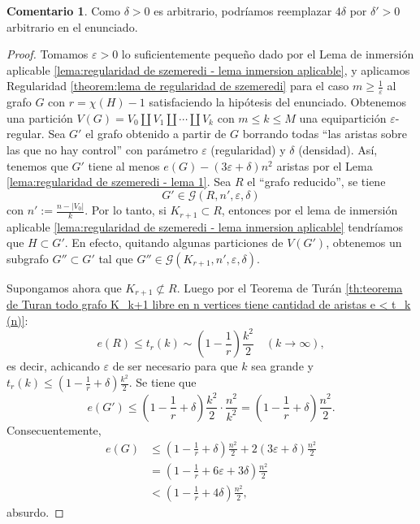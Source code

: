 \documentclass[12pt]{report}
\theoremstyle{plain}
\theoremstyle{definition}
\newtheorem{remark}[theorem]{Comentario}
\newcommand{\abs}[1]{\left \vert #1 \right \vert}
\begin{document}
\begin{remark}
Como $\delta > 0$ es arbitrario, podríamos reemplazar $4\delta$ por $\delta ' > 0$ arbitrario en el enunciado.
\end{remark}

\begin{proof}
Tomamos $\varepsilon > 0$ lo suficientemente pequeño dado por el Lema de inmersión aplicable \ref{lema:regularidad de szemeredi - lema inmersion aplicable}, y aplicamos Regularidad \ref{theorem:lema de regularidad de szemeredi} para el caso $m \geq \frac 1 \varepsilon$ al grafo $G$ con $r = \chi (H) -1$ satisfaciendo la hipótesis del enunciado. Obtenemos una partición $V(G) = V_0 \coprod V_1 \coprod \cdots \coprod V_k$ con $m \leq k \leq M$ una equipartición $\varepsilon$-regular. Sea $G'$ el grafo obtenido a partir de $G$ borrando todas ``las aristas sobre las que no hay control'' con parámetro $\varepsilon$ (regularidad) y $\delta$ (densidad). Así, tenemos que $G'$ tiene al menos $e(G) - (3 \varepsilon + \delta) n^2$ aristas por el Lema \ref{lema:regularidad de szemeredi - lema 1}. Sea $R$ el ``grafo reducido'', se tiene
\[
    G' \in \mathcal G (R, n', \varepsilon , \delta)
\]
con $n' := \frac{n - \abs{V_0}}{k}$. Por lo tanto, si $K_{r+1} \subset R$, entonces por el lema de inmersión aplicable \ref{lema:regularidad de szemeredi - lema inmersion aplicable} tendríamos que $H \subset G'$. En efecto, quitando algunas particiones de $V(G')$, obtenemos un subgrafo $G'' \subset G'$ tal que $G'' \in \mathcal G (K_{r+1}, n', \varepsilon, \delta)$.

Supongamos ahora que $K_{r+1} \not \subset R$. Luego por el Teorema de Turán \ref{th:teorema de Turan todo grafo K_k+1 libre en n vertices tiene cantidad de aristas e < t_k (n)}:
\[
    e(R) \leq t_r (k) \sim  \left (1 - \frac 1 r \right ) \frac{k^2}{2} \quad (k \to \infty),
\]
es decir, achicando $\varepsilon$ de ser necesario para que $k$ sea grande y $t_r (k) \leq \left ( 1 - \frac 1 r + \delta \right ) \frac{k^2}{2}$. Se tiene que
\[
    e(G') \leq \left ( 1 - \frac 1 r + \delta \right ) \frac{k^2}{2} \cdot \frac{n^2}{k^2} = \left (1 - \frac 1 r + \delta \right ) \frac{n^2}{2}.
\]
Consecuentemente,
\begin{align*}
e(G) &\leq \left ( 1 - \frac 1 r + \delta \right )\frac{n^2}{2} + 2(3 \varepsilon +\delta)\frac{n^2}{2} \\
    &= \left ( 1 - \frac 1 r + 6 \varepsilon + 3\delta \right ) \frac{n^2}{2} \\
    &< \left ( 1 - \frac 1 r + 4 \delta \right ) \frac{n^2}{2},
\end{align*}
absurdo.
\end{proof}
\end{document}
